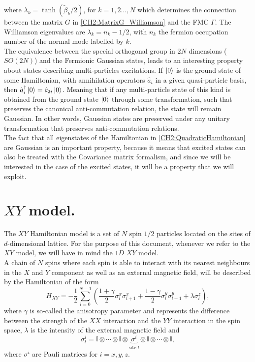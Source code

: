 where $\lambda_k = \operatorname{tanh}(\tilde{\beta}_k/2)$, for $k=1,2\ldots,N$ \cite{kraus_pairing_2009} which determines the connection between the matrix $G$ in \eqref{CH2:MatrixG_Williamson} and the FMC $\Gamma$. The Williamson eigenvalues are $\lambda_k=n_k -1/2$, with $n_k$ the fermion occupation number of the normal mode labelled by $k$. \\
\indent The equivalence between the special orthogonal group in $2N$ dimensions ($SO(2N)$) and the Fermionic Gaussian states, leads to an interesting  property about states describing multi-particles excitations. If $\mathinner{|{0}\rangle}$ is the ground state of some Hamiltonian, with annihilation operators $\hat{a}_{i}$ in a given quasi-particle basis, then $\hat{a}_{i}^{\dagger}\mathinner{|{0}\rangle} = \hat{c}_{2i}\mathinner{|{0}\rangle}$. Meaning that if any multi-particle state of this kind is obtained from the ground state $\mathinner{|{0}\rangle}$ through some transformation, such that preserves the canonical anti-commutation relation, the state will remain Gaussian. In other words, Gaussian states are preserved under any unitary transformation that preserves anti-commutation relations.\\
\indent The fact that all eigenstates of the Hamiltonian in \eqref{CH2:QuadraticHamiltonian} are Gaussian is an important property, because it means that excited states can also be treated with the Covariance matrix formalism, and since we will be interested in the case of the excited states, it will be a property that we will exploit.
\section{$XY$ model.}
The $XY$ Hamiltonian model is a set of $N$ spin $1/2$ particles located on the sites of $d$-dimensional lattice. For the purpose of this document, whenever we refer to the $XY$ model, we will have in mind the $1D$ $XY$ model.\\
\indent A chain of $N$ spins where each spin is able to interact with its nearest neighbours in the $X$ and $Y$ component as well as an external magnetic field, will be described by the Hamiltonian of the form
\begin{equation}
H_{XY}=-\frac{1}{2} \sum_{l=0}^{N-1}\left(\frac{1+\gamma}{2} \sigma_{l}^{x} \sigma_{l+1}^{x}+\frac{1-\gamma}{2} \sigma_{l}^{y} \sigma_{l+1}^{y}+\lambda \sigma_{l}^{z}\right),
\label{CH3:Hamiltonian_XY}
\end{equation}
where $\gamma$ is so-called the anisotropy parameter and represents the difference between the strength of the $XX$ interaction and the $YY$ interaction in the spin space, $\lambda$ is the intensity of the external magnetic field and
\begin{equation}
\sigma^{i}_{l} = \mathbb{I}\otimes\cdots \otimes\mathbb{I}\otimes\underbrace{\sigma^{i}}_{\text{site } l}\otimes\mathbb{I}\otimes\cdots\otimes\mathbb{I},
\end{equation}
where $\sigma^{i}$ are Pauli matrices for $i=x, y, z$.
